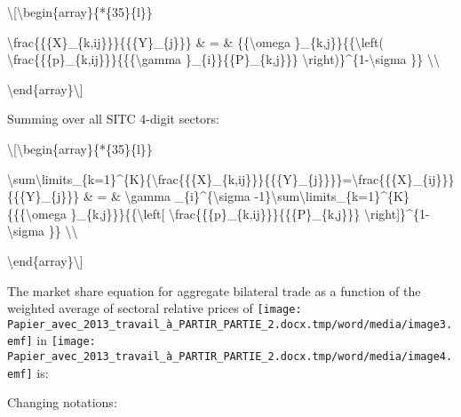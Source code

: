 \documentclass[12pt,twoside,a4paper,notitlepage]{article}
\begin{document}
\textbackslash [\textbackslash begin\{array\}\{*\{35\}\{l\}\}

 \textbackslash frac\{\{\{X\}\_\{k,ij\}\}\}\{\{\{Y\}\_\{j\}\}\} \& = \& \{\{\textbackslash omega \}\_\{k,j\}\}\{\{\textbackslash left( \textbackslash frac\{\{\{p\}\_\{k,ij\}\}\}\{\{\{\textbackslash gamma \}\_\{i\}\}\{\{P\}\_\{k,j\}\}\} \textbackslash right)\}\textasciicircum{}\{1-\textbackslash sigma \}\} \textbackslash \textbackslash 

\textbackslash end\{array\}\textbackslash ]

 Summing over all SITC 4-digit sectors: 

\textbackslash [\textbackslash begin\{array\}\{*\{35\}\{l\}\}

 \textbackslash sum\textbackslash limits\_\{k=1\}\textasciicircum{}\{K\}\{\textbackslash frac\{\{\{X\}\_\{k,ij\}\}\}\{\{\{Y\}\_\{j\}\}\}\}=\textbackslash frac\{\{\{X\}\_\{ij\}\}\}\{\{\{Y\}\_\{j\}\}\} \& = \& \textbackslash gamma \_\{i\}\textasciicircum{}\{\textbackslash sigma -1\}\textbackslash sum\textbackslash limits\_\{k=1\}\textasciicircum{}\{K\}\{\{\{\textbackslash omega \}\_\{k,j\}\}\}\{\{\textbackslash left[ \textbackslash frac\{\{\{p\}\_\{k,ij\}\}\}\{\{\{P\}\_\{k,j\}\}\} \textbackslash right]\}\textasciicircum{}\{1-\textbackslash sigma \}\} \textbackslash \textbackslash 

\textbackslash end\{array\}\textbackslash ]

The market share equation for aggregate bilateral trade as a function of the weighted average of sectoral relative prices of \texttt{[image: Papier\_avec\_2013\_travail\_à\_PARTIR\_PARTIE\_2.docx.tmp/word/media/image3.emf]} in \texttt{[image: Papier\_avec\_2013\_travail\_à\_PARTIR\_PARTIE\_2.docx.tmp/word/media/image4.emf]} is: 

 Changing notations:

\raisebox{-28pt}{\textbackslash [\textbackslash begin\{array\}\{*\{35\}\{l\}\}}

\end{document}
